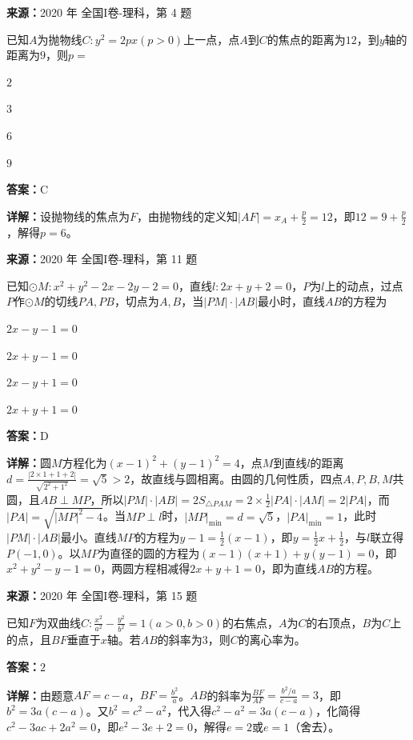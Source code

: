 \begin{question}[points=5]
\textbf{来源：}2020 年 全国I卷-理科，第 4 题\par
已知$A$为抛物线$C:y^2=2px(p>0)$上一点，点$A$到$C$的焦点的距离为$12$，到$y$轴的距离为$9$，则$p=$
\begin{choices}
  \item $2$
  \item $3$
  \item $6$
  \item $9$
\end{choices}
\begin{solution}
\textbf{答案：}C

\textbf{详解：}设抛物线的焦点为$F$，由抛物线的定义知$|AF|=x_A+\frac{p}{2}=12$，即$12=9+\frac{p}{2}$，解得$p=6$。
\end{solution}
\end{question}

\begin{question}[points=5]
\textbf{来源：}2020 年 全国I卷-理科，第 11 题\par
已知$\odot M:x^2+y^2-2x-2y-2=0$，直线$l:2x+y+2=0$，$P$为$l$上的动点，过点$P$作$\odot M$的切线$PA,PB$，切点为$A,B$，当$|PM|\cdot|AB|$最小时，直线$AB$的方程为
\begin{choices}
  \item $2x-y-1=0$
  \item $2x+y-1=0$
  \item $2x-y+1=0$
  \item $2x+y+1=0$
\end{choices}
\begin{solution}
\textbf{答案：}D

\textbf{详解：}圆$M$方程化为$(x-1)^2+(y-1)^2=4$，点$M$到直线$l$的距离$d=\frac{|2\times1+1+2|}{\sqrt{2^2+1^2}}=\sqrt{5}>2$，故直线与圆相离。由圆的几何性质，四点$A,P,B,M$共圆，且$AB\perp MP$，所以$|PM|\cdot|AB|=2S_{\triangle PAM}=2\times\frac{1}{2}|PA|\cdot|AM|=2|PA|$，而$|PA|=\sqrt{|MP|^2-4}$。当$MP\perp l$时，$|MP|_{\min}=d=\sqrt{5}$，$|PA|_{\min}=1$，此时$|PM|\cdot|AB|$最小。直线$MP$的方程为$y-1=\frac{1}{2}(x-1)$，即$y=\frac{1}{2}x+\frac{1}{2}$，与$l$联立得$P(-1,0)$。以$MP$为直径的圆的方程为$(x-1)(x+1)+y(y-1)=0$，即$x^2+y^2-y-1=0$，两圆方程相减得$2x+y+1=0$，即为直线$AB$的方程。
\end{solution}
\end{question}

\begin{question}[points=5]
\textbf{来源：}2020 年 全国I卷-理科，第 15 题\par
已知$F$为双曲线$C:\frac{x^2}{a^2}-\frac{y^2}{b^2}=1(a>0,b>0)$的右焦点，$A$为$C$的右顶点，$B$为$C$上的点，且$BF$垂直于$x$轴。若$AB$的斜率为$3$，则$C$的离心率为。
\fillin[{$2$}]
\begin{solution}
\textbf{答案：}$2$

\textbf{详解：}由题意$AF=c-a$，$BF=\frac{b^2}{a}$。$AB$的斜率为$\frac{BF}{AF}=\frac{b^2/a}{c-a}=3$，即$b^2=3a(c-a)$。又$b^2=c^2-a^2$，代入得$c^2-a^2=3a(c-a)$，化简得$c^2-3ac+2a^2=0$，即$e^2-3e+2=0$，解得$e=2$或$e=1$（舍去）。
\end{solution}
\end{question}


